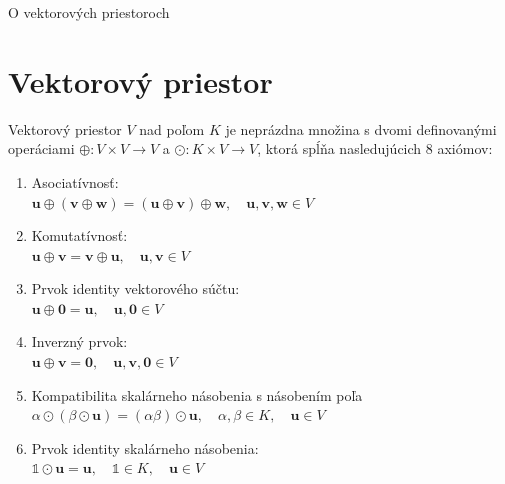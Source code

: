 \documentclass[a4paper, 10pt, ]{article}
\begin{document}
\begin{flushleft}
    O vektorových priestoroch
\end{flushleft}

\bigskip

\normalsize
\normalfont

\section{Vektorový priestor}
\label{VectorSpace}

\begin{definition}
    \label{VectorSpace.Definition:VectorSpace}
    Vektorový priestor $V$ nad poľom $K$ je neprázdna množina s dvomi definovanými operáciami $\oplus: V \times V \rightarrow V$  a $\odot: K \times V \rightarrow V$, ktorá spĺňa nasledujúcich 8 axiómov:
    \begin{enumerate}
        \TabPositions{1cm}
        \item Asociatívnosť: \\
        \tab\tab $\bm{u} \oplus (\bm{v} \oplus \bm{w}) = (\bm{u} \oplus \bm{v}) \oplus \bm{w}, \quad \bm{u}, \bm{v}, \bm{w} \in V$
        
        \item Komutatívnosť: \\
        \tab\tab $\bm{u} \oplus \bm{v} = \bm{v} \oplus \bm{u}, \quad \bm{u}, \bm{v} \in V$
        
        \item Prvok identity vektorového súčtu: \\
        \tab\tab $\bm{u} \oplus \bm{0} = \bm{u}, \quad \bm{u}, \bm{0} \in V$
        
        \item Inverzný prvok: \\
        \tab\tab $\bm{u} \oplus \bm{v} = \bm{0}, \quad \bm{u}, \bm{v}, \bm{0} \in V$
        
        \item Kompatibilita skalárneho násobenia s násobením poľa \\
        \tab\tab $\alpha \odot (\beta \odot \bm{u}) = (\alpha \beta) \odot \bm{u}, \quad \alpha, \beta \in K, \quad \bm{u} \in V$
        
        \item Prvok identity skalárneho násobenia: \\
        \tab\tab $\mathbb{1} \odot \bm{u} = \bm{u}, \quad \mathbb{1} \in K, \quad \bm{u} \in V$
        

\end{enumerate}
\end{definition}
\end{document}
